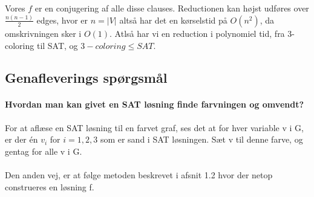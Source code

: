 \documentclass[paper=a4, fontsize=11pt]{scrartcl} %
\numberwithin{equation}{section} %
\numberwithin{figure}{section} %
\numberwithin{table}{section} %
\begin{document}
	Vores $f$ er en conjugering af alle disse clauses. Reductionen kan højst udføres over $\frac{n(n-1)}{2}$ edges, hvor er $n=|V|$ altså har det en kørselstid på $O(n^2)$, da omskrivningen sker i $O(1)$. Atlså har vi en reduction i polynomiel tid, fra 3-coloring til SAT, og $3-coloring \leq SAT$.
	
	\subsection{Genafleverings spørgsmål}

    \paragraph{Hvordan man kan givet en SAT løsning finde farvningen og omvendt?}
    For at aflæse en SAT løsning til en farvet graf, ses det at for hver variable v i G, er der én $v_i$ for $i=1,2,3$ som er sand i SAT løsningen. Sæt v til denne farve, og gentag for alle v i G. \\ \\
    Den anden vej, er at følge metoden beskrevet i afsnit 1.2 hvor der netop construeres en løsning f. 
    
\end{document}

